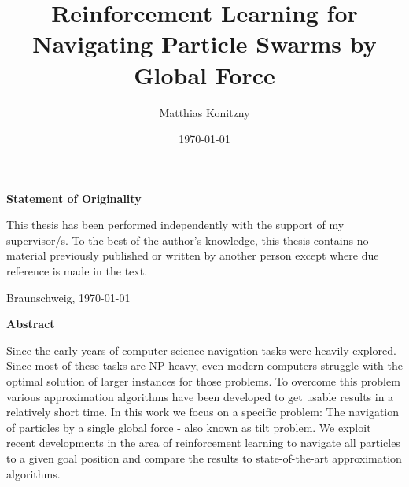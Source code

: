 \documentclass[%
  a4paper,%
  11pt,%
  style=print,
  blue,%
  bibliography=totoc,
  nexus,
  lnum,
  extramargin
  ]{tubsbook}
\title{Reinforcement Learning for Navigating Particle Swarms by Global Force}
\author{Matthias Konitzny}
\date{\today}
\begin{document}
\maketitle

\frontmatter

\cleardoublepage


\thispagestyle{plain} %
\vspace*{7cm}
\centerline{\bfseries Statement of Originality}
\vspace*{1em}
\noindent
This thesis has been performed independently with the support of my supervisor/s.
To the best of the author's knowledge, this thesis contains no material previously
published or written by another person except where due reference is made in the text.

\par
  \bigskip\noindent Braunschweig, \today \par
  \vspace*{10mm}
  \hfill\hrulefill
\cleardoublepage

\thispagestyle{plain} %
\centerline{\bfseries Abstract}
\vspace*{1em}
\noindent
Since the early years of computer science navigation tasks were heavily explored. Since most of these tasks are NP-heavy, even modern computers struggle with the optimal solution of larger instances for those problems. To overcome this problem various approximation algorithms have been developed to get usable results in a relatively short time. In this work we focus on a specific problem: The navigation of particles by a single global force - also known as tilt problem. We exploit recent developments in the area of reinforcement learning to navigate all particles to a given goal position and compare the results to state-of-the-art approximation algorithms. %
\cleardoublepage

\tableofcontents
\cleardoublepage

\listoffigures
\cleardoublepage

\listoftables
\cleardoublepage

\listofalgorithms
\cleardoublepage



\mainmatter












\end{document}

